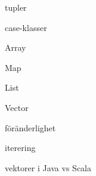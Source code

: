 \item tupler
\item case-klasser
\item Array
\item Map
\item List
\item Vector
\item föränderlighet
\item iterering
\item vektorer i Java vs Scala
